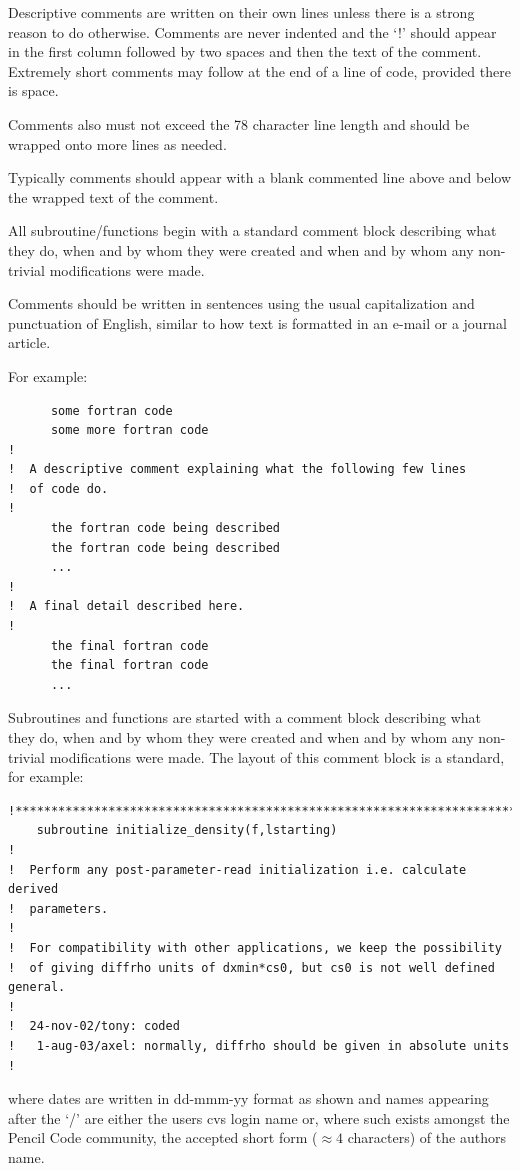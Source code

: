 \documentclass[\mydriver,12pt,twoside,notitlepage,a4paper]{article}
\begin{document}
Descriptive comments are written on their own lines unless there is a strong
reason to do otherwise. Comments are never indented and the `!' should appear
in the first column followed by two spaces and then the text of the comment.
Extremely short comments may follow at the end of a line of code, provided
there is space.

Comments also must not exceed the 78 character line length and should be
wrapped onto more lines as needed.

Typically comments should appear with a blank commented line above and below
the wrapped text of the comment.

All subroutine/functions begin with a standard comment block describing what
they do, when and by whom they were created and when and by whom any
non-trivial modifications were made.

Comments should be written in sentences using the usual capitalization and
punctuation of English, similar to how text is formatted in an e-mail or a
journal article.

For example:
\begin{verbatim}
      some fortran code
      some more fortran code
!
!  A descriptive comment explaining what the following few lines
!  of code do.
!
      the fortran code being described
      the fortran code being described
      ...
!
!  A final detail described here.
!
      the final fortran code
      the final fortran code
      ...
\end{verbatim}

Subroutines and functions are started with a comment block describing
what they do, when and by whom they were created and when and by whom any
non-trivial modifications were made. The layout of this comment block
is a standard, for example:
\begin{verbatim}
!***********************************************************************
    subroutine initialize_density(f,lstarting)
!
!  Perform any post-parameter-read initialization i.e. calculate derived
!  parameters.
!
!  For compatibility with other applications, we keep the possibility
!  of giving diffrho units of dxmin*cs0, but cs0 is not well defined general.
!
!  24-nov-02/tony: coded
!   1-aug-03/axel: normally, diffrho should be given in absolute units
!
\end{verbatim}
where dates are written in dd-mmm-yy format as shown and names appearing
after the `/' are either the users cvs login name or, where such exists
amongst the {\sc Pencil Code} community, the accepted short form ($\approx 4$
characters) of the authors name.
\end{document}
